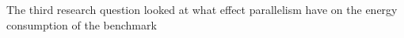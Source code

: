 The third research question looked at what effect parallelism have on the energy consumption of the benchmark











